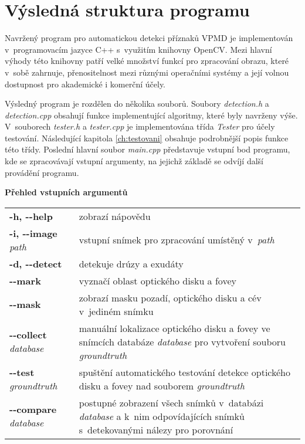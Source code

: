 \section{Výsledná struktura programu}
Navržený program pro automatickou detekci příznaků VPMD je implementován v~programovacím jazyce C++ s~využitím knihovny OpenCV. Mezi hlavní výhody této knihovny patří velké množství funkcí pro zpracování obrazu, které v~sobě zahrnuje, přenositelnost mezi různými operačními systémy a její volnou dostupnost pro akademické i komerční účely.

Výsledný program je rozdělen do několika souborů. Soubory \emph{detection.h} a \emph{detection.cpp} obsahují funkce implementující algoritmy, které byly navrženy výše. V~souborech \emph{tester.h} a \emph{tester.cpp} je implementována třída \emph{Tester} pro účely testování. Následující kapitola \ref{ch:testovani} obsahuje podrobnější popis funkce této třídy. Poslední hlavní soubor \emph{main.cpp} představuje vstupní bod programu, kde se zpracovávají vstupní argumenty, na jejichž základě se odvíjí další provádění programu.\par 

\bigskip\bigskip
\noindent\textbf{Přehled vstupních argumentů}\par\bigskip

\begin{tabularx}{\textwidth}{p{4cm}X}
  \textbf{-h, {-}{-}help}               & zobrazí nápovědu \\[5mm]
  \textbf{-i, {-}{-}image} \emph{path}   & vstupní snímek pro zpracování umístěný v~\emph{path} \\[5mm]
  \textbf{-d, {-}{-}detect}             & detekuje drúzy a exudáty \\[5mm]
  \textbf{{-}{-}mark}                   & vyznačí oblast optického disku a fovey \\[5mm]
  \textbf{{-}{-}mask}                   & zobrazí masku pozadí, optického disku a cév v~jediném snímku \\[5mm]
  \textbf{{-}{-}collect} \emph{database} & manuální lokalizace optického disku a fovey ve snímcích databáze \emph{database} pro vytvoření souboru \emph{groundtruth}\\[5mm]
  \textbf{{-}{-}test} \emph{groundtruth} & spuštění automatického testování detekce optického disku a fovey nad souborem \emph{groundtruth} \\[5mm]
  \textbf{{-}{-}compare} \emph{database} & postupné zobrazení všech snímků v~databázi \emph{database} a k~nim odpovídajících snímků s~detekovanými nálezy pro porovnání \\[5mm]
\end{tabularx}

